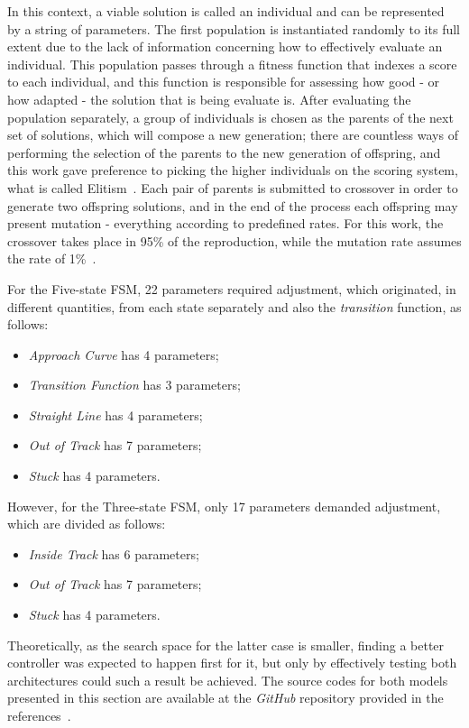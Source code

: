	In this context, a viable solution is called an individual and can be represented by a string of parameters. The first population is instantiated randomly to its full extent due to the lack of information concerning how to effectively evaluate an individual. This population passes through a fitness function that indexes a score to each individual, and this function is responsible for assessing how good - or how adapted - the solution that is being evaluate is. After evaluating the population separately, a group of individuals is chosen as the parents of the next set of solutions, which will compose a new generation; there are countless ways of performing the selection of the parents to the new generation of offspring, and this work gave preference to picking the higher individuals on the scoring system, what is called Elitism~\cite{ELITISM}. Each pair of parents is submitted to crossover in order to generate two offspring solutions, and in the end of the process each offspring may present mutation - everything according to predefined rates. For this work, the crossover takes place in 95\% of the reproduction, while the mutation rate assumes the rate of 1\%~\cite{RATES}.
	
	For the Five-state FSM, 22 parameters required adjustment, which originated, in different quantities, from each state separately and also the \emph{transition} function, as follows:
	
	\begin{itemize}
		
		\item \emph{Approach Curve} has 4 parameters;
		
		\item \emph{Transition Function} has 3 parameters;
		
		\item \emph{Straight Line} has 4 parameters;
		
		\item \emph{Out of Track} has 7 parameters;
		
		\item \emph{Stuck} has 4 parameters.
		
	\end{itemize}
	
	However, for the Three-state FSM, only 17 parameters demanded adjustment, which are divided as follows:
	
	\begin{itemize}
		
		\item \emph{Inside Track} has 6 parameters;
		
		\item \emph{Out of Track} has 7 parameters;
		
		\item \emph{Stuck} has 4 parameters.
		
	\end{itemize}
	
	Theoretically, as the search space for the latter case is smaller, finding a better controller was expected to happen first for it, but only by effectively testing both architectures could such a result be achieved. The source codes for both models presented in this section are available at the \emph{GitHub} repository provided in the references~\cite{GitHub}.
